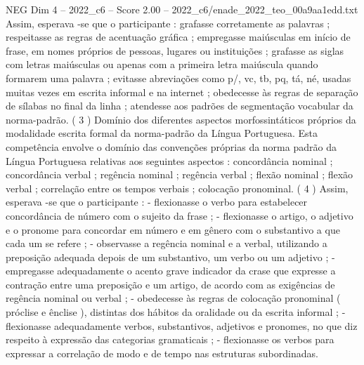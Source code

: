 \begin{textsample}{NEG Dim 4 – 2022\_c6 – Score 2.00 – 2022\_c6/enade\_2022\_teo\_00a9aa1edd.txt}
Assim, esperava -se que o participante : grafasse corretamente as palavras ; respeitasse as regras de acentuação gráfica ; empregasse maiúsculas em início de frase, em nomes próprios de pessoas, lugares ou instituições ; grafasse as siglas com letras maiúsculas ou apenas com a primeira letra maiúscula quando formarem uma palavra ; evitasse abreviações como p/, vc, tb, pq, tá, né, usadas muitas vezes em escrita informal e na internet ; obedecesse às regras de separação de sílabas no final da linha ; atendesse aos padrões de segmentação vocabular da norma-padrão. ( 3 ) Domínio dos diferentes aspectos morfossintáticos próprios da modalidade escrita formal da norma-padrão da Língua Portuguesa.
Esta competência envolve o domínio das convenções próprias da norma padrão da Língua Portuguesa relativas aos seguintes aspectos : concordância nominal ; concordância verbal ; regência nominal ; regência verbal ; flexão nominal ; flexão verbal ; correlação entre os tempos verbais ; colocação pronominal. ( 4 ) Assim, esperava -se que o participante : - flexionasse o verbo para estabelecer concordância de número com o sujeito da frase ; - flexionasse o artigo, o adjetivo e o pronome para concordar em número e em gênero com o substantivo a que cada um se refere ; - observasse a regência nominal e a verbal, utilizando a preposição adequada depois de um substantivo, um verbo ou um adjetivo ; - empregasse adequadamente o acento grave indicador da crase que expresse a contração entre uma preposição e um artigo, de acordo com as exigências de regência nominal ou verbal ; - obedecesse às regras de colocação pronominal ( próclise e ênclise ), distintas dos hábitos da oralidade ou da escrita informal ; - flexionasse adequadamente verbos, substantivos, adjetivos e pronomes, no que diz respeito à expressão das categorias gramaticais ; - flexionasse os verbos para expressar a correlação de modo e de tempo nas estruturas subordinadas.

\end{textsample}
